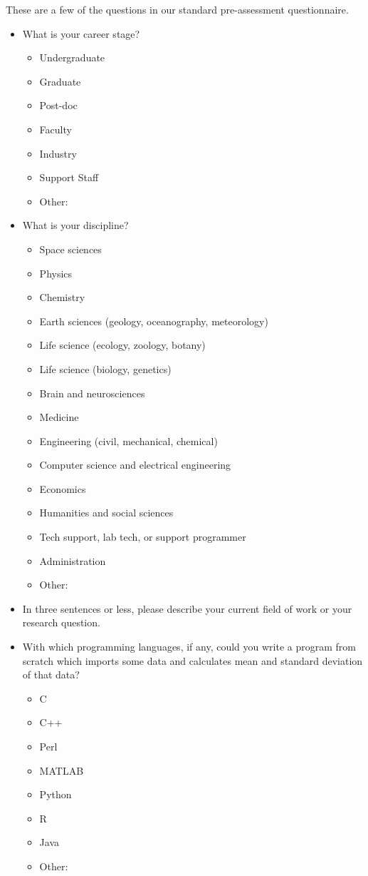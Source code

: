 \documentclass[10pt,a4paper,twocolumn]{article}
\begin{document}
These are a few of the questions in our standard pre-assessment questionnaire.

\begin{itemize}

\item
  What is your career stage?
  \begin{itemize}[noitemsep]
    \item Undergraduate
    \item Graduate
    \item Post-doc
    \item Faculty
    \item Industry
    \item Support Staff
    \item Other:
  \end{itemize}

\item
  What is your discipline?
  \begin{itemize}[noitemsep]
    \item Space sciences
    \item Physics
    \item Chemistry
    \item Earth sciences (geology, oceanography, meteorology)
    \item Life science (ecology, zoology, botany)
    \item Life science (biology, genetics)
    \item Brain and neurosciences
    \item Medicine
    \item Engineering (civil, mechanical, chemical)
    \item Computer science and electrical engineering
    \item Economics
    \item Humanities and social sciences
    \item Tech support, lab tech, or support programmer
    \item Administration
    \item Other:
  \end{itemize}

\item
  In three sentences or less, please describe your current field of
  work or your research question.

\item
  With which programming languages, if any, could you write a program
  from scratch which imports some data and calculates mean and
  standard deviation of that data?
  \begin{itemize}[noitemsep]
    \item C
    \item C++
    \item Perl
    \item MATLAB
    \item Python
    \item R
    \item Java
    \item Other:
  \end{itemize}


\end{itemize}
\end{document}

